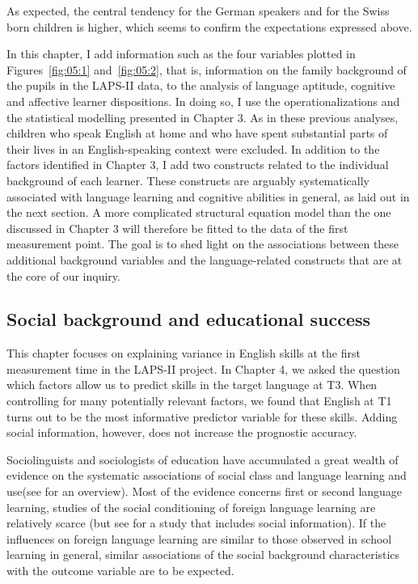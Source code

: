 \documentclass[output=paper]{langsci/langscibook}
\begin{document}
\begin{sloppypar}
As expected, the central tendency for the German speakers and for the Swiss born children is higher, which seems to confirm the expectations expressed above.
\end{sloppypar}

In this chapter, I add information such as the four variables plotted in Figures~\ref{fig:05:1} and~\ref{fig:05:2}, that is, information on the family background of the pupils in the LAPS-II data, to the analysis of language aptitude, cognitive and affective learner dispositions. In doing so, I use the operationalizations and the statistical modelling presented in Chapter 3. As in these previous analyses, children who speak English at home and who have spent substantial parts of their lives in an English-speaking context were excluded. In addition to the factors identified in Chapter 3, I add two constructs related to the individual background of each learner. These constructs are arguably systematically associated with language learning and cognitive abilities in general, as laid out in the next section. A more complicated structural equation model than the one discussed in Chapter 3 will therefore be fitted to the data of the first measurement point. The goal is to shed light on the associations between these additional background variables and the language-related constructs that are at the core of our inquiry.

\subsection{Social background and educational success}\largerpage

This chapter focuses on explaining variance in English skills at the first measurement time in the LAPS-II project. In Chapter 4, we asked the question which factors allow us to predict skills in the target language at T3. When controlling for many potentially relevant factors, we found that English at T1 turns out to be the most informative predictor variable for these skills. Adding social information, however, does not increase the prognostic accuracy.

Sociolinguists and sociologists of education have accumulated a great wealth of evidence on the systematic associations of social class and language learning and use(see \citealt{AvineriJohnson2015} for an overview). Most of the evidence concerns first or second language learning, studies of the social conditioning of foreign language learning are relatively scarce (but see \citealt{Klieme2008} for a study that includes social information). If the influences on foreign language learning are similar to those observed in school learning in general, similar associations of the social background characteristics with the outcome variable are to be expected. 
\end{document}

